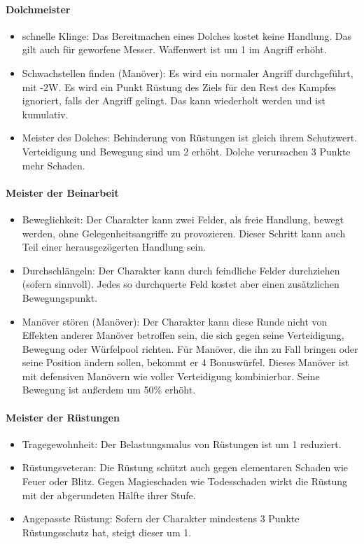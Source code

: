 \documentclass{article}
\begin{document}
\paragraph{Dolchmeister}

\begin{itemize}
\item schnelle Klinge: Das Bereitmachen eines Dolches kostet keine Handlung. Das gilt auch für geworfene Messer. Waffenwert ist um 1 im Angriff erhöht.
\item Schwachstellen finden (Manöver): Es wird ein normaler Angriff durchgeführt, mit -2W. Es wird ein Punkt Rüstung des Ziels für den Rest des Kampfes ignoriert, falls der Angriff gelingt. Das kann wiederholt werden und ist kumulativ.
\item Meister des Dolches: Behinderung von Rüstungen ist gleich ihrem Schutzwert. Verteidigung und Bewegung sind um 2 erhöht. Dolche verursachen 3 Punkte mehr Schaden.
\end{itemize}

\paragraph{Meister der Beinarbeit}

\begin{itemize}
\item Beweglichkeit: Der Charakter kann zwei Felder, als freie Handlung, bewegt werden, ohne Gelegenheitsangriffe zu provozieren. Dieser Schritt kann auch Teil einer herausgezögerten Handlung sein.
\item Durchschlängeln: Der Charakter kann durch feindliche Felder durchziehen (sofern sinnvoll). Jedes so durchquerte Feld kostet aber einen zusätzlichen Bewegungspunkt.
\item Manöver stören (Manöver): Der Charakter kann diese Runde nicht von Effekten anderer Manöver betroffen sein, die sich gegen seine Verteidigung, Bewegung oder Würfelpool richten. Für Manöver, die ihn zu Fall bringen oder seine Position ändern sollen, bekommt er 4 Bonuswürfel. Dieses Manöver ist mit defensiven Manövern wie voller Verteidigung kombinierbar. Seine Bewegung ist außerdem um 50\% erhöht.
\end{itemize}

\paragraph{Meister der Rüstungen}

\begin{itemize}
\item Tragegewohnheit: Der Belastungsmalus von Rüstungen ist um 1 reduziert.
\item Rüstungsveteran: Die Rüstung schützt auch gegen elementaren Schaden wie Feuer oder Blitz. Gegen Magieschaden wie Todesschaden wirkt die Rüstung mit der abgerundeten Hälfte ihrer Stufe.
\item Angepasste Rüstung: Sofern der Charakter mindestens 3 Punkte Rüstungsschutz hat, steigt dieser um 1.
\end{itemize}
\end{document}
